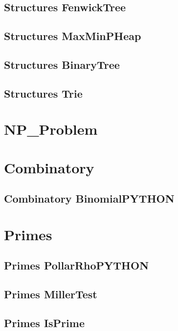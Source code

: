 \subsection{Structures FenwickTree}
\raggedbottom
\hrulefill
\subsection{Structures MaxMinPHeap}
\raggedbottom
\hrulefill
\subsection{Structures BinaryTree}
\raggedbottom
\hrulefill
\subsection{Structures Trie}
\raggedbottom
\hrulefill

\section{NP_Problem}

\section{Combinatory}
\subsection{Combinatory BinomialPYTHON}
\raggedbottom
\hrulefill

\section{Primes}
\subsection{Primes PollarRhoPYTHON}
\raggedbottom
\hrulefill
\subsection{Primes MillerTest}
\raggedbottom
\hrulefill
\subsection{Primes IsPrime}
\raggedbottom
\hrulefill
